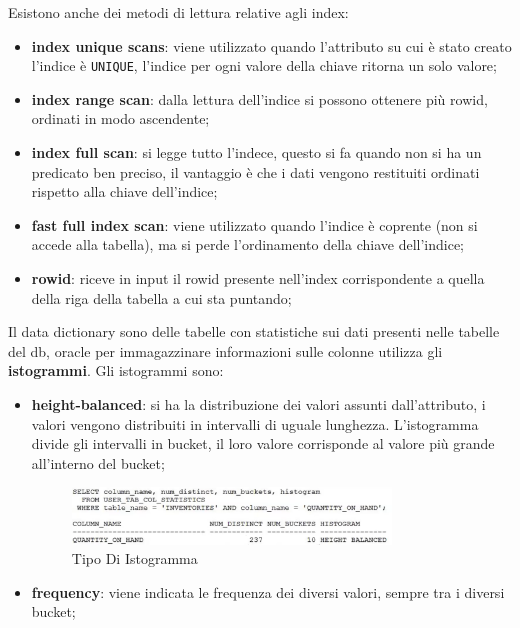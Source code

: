 \documentclass[12pt]{article}
\begin{document}
Esistono anche dei metodi di lettura relative agli index:
\begin{itemize}
    \item \textbf{index unique scans}: viene utilizzato quando l'attributo su cui \`e stato creato l'indice \`e \texttt{UNIQUE}, l'indice per ogni valore della chiave ritorna un solo valore;
    \item \textbf{index range scan}: dalla lettura dell'indice si possono ottenere pi\`u rowid, ordinati in modo ascendente;
    \item \textbf{index full scan}: si legge tutto l'indece, questo si fa quando non si ha un predicato ben preciso, il vantaggio \`e che i dati vengono restituiti ordinati rispetto alla chiave dell'indice;
    \item \textbf{fast full index scan}: viene utilizzato quando l'indice \`e coprente (non si accede alla tabella), ma si perde l'ordinamento della chiave dell'indice;
    \item \textbf{rowid}: riceve in input il rowid presente nell'index corrispondente a quella della riga della tabella a cui sta puntando;
\end{itemize}



Il data dictionary sono delle tabelle con statistiche sui dati presenti nelle tabelle del db, oracle per immagazzinare informazioni sulle colonne utilizza gli \textbf{istogrammi}. Gli istogrammi sono:
\begin{itemize}
    \item \textbf{height-balanced}: si ha la distribuzione dei valori assunti dall'attributo, i valori vengono distribuiti in intervalli di uguale lunghezza. L'istogramma divide gli intervalli in bucket, il loro valore corrisponde al valore pi\`u grande all'interno del bucket;
        \begin{figure}[H]
            \centering
            \includegraphics[width=0.8\textwidth]{tipo-di-istogramma.png}
            \caption{Tipo Di Istogramma}
            \label{fig:tipo-di-istogramma}
        \end{figure}
    \item \textbf{frequency}: viene indicata le frequenza dei diversi valori, sempre tra i diversi bucket;
\end{itemize}
\end{document}
